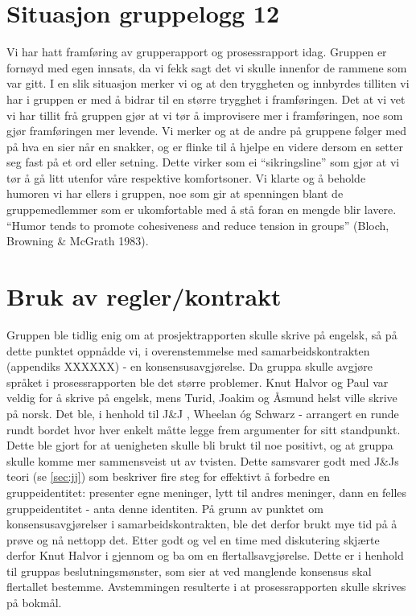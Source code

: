 \section{Situasjon gruppelogg 12}
Vi har hatt framføring av grupperapport og prosessrapport idag. Gruppen er fornøyd med egen innsats, da vi fekk sagt det vi skulle innenfor de rammene som var gitt. I en slik situasjon merker vi og at den tryggheten og innbyrdes tilliten vi har i gruppen er med å bidrar til en større trygghet i framføringen. Det at vi vet vi har tillit frå gruppen gjør at vi tør å improvisere mer i framføringen, noe som gjør framføringen mer levende. Vi merker og at de andre på gruppene følger med på hva en sier når en snakker, og er flinke til å hjelpe en videre dersom en setter seg fast på et ord eller setning. Dette virker som ei ``sikringsline'' som gjør at vi tør å gå litt utenfor våre respektive komfortsoner. Vi klarte og å beholde humoren vi har ellers i gruppen, noe som gir at spenningen blant de gruppemedlemmer som er ukomfortable med å stå foran en mengde blir lavere. ``Humor tends to promote cohesiveness and reduce tension in groups'' (Bloch, Browning \& McGrath 1983).\\


\section{Bruk av regler/kontrakt}

Gruppen ble tidlig enig om at prosjektrapporten skulle skrive på engelsk, så på
dette punktet oppnådde vi, i overenstemmelse med samarbeidskontrakten (appendiks
XXXXXX) - en konsensusavgjørelse. Da gruppa skulle avgjøre språket i
prosessrapporten ble det større problemer. Knut Halvor og Paul var veldig for å
skrive på engelsk, mens Turid, Joakim og Åsmund helst ville skrive på norsk. Det
ble, i henhold til J\&J \cite{jj}, Wheelan \cite{wheelan} óg Schwarz
\cite{schwarz} - arrangert en runde rundt bordet hvor hver enkelt måtte legge
frem argumenter for sitt standpunkt. Dette ble gjort for at uenigheten skulle
bli brukt til noe positivt, og at gruppa skulle komme mer sammensveist ut av
tvisten. Dette samsvarer godt med J\&Js teori (se \cref{sec:jj}) som beskriver
fire steg for effektivt å forbedre en gruppeidentitet: presenter egne meninger,
lytt til andres meninger, dann en felles gruppeidentitet - anta denne identiten.
På grunn av punktet om konsensusavgjørelser i samarbeidskontrakten, ble det
derfor brukt mye tid på å prøve og nå nettopp det. Etter godt og vel en time med
diskutering skjærte derfor Knut Halvor i gjennom og ba om en
flertallsavgjørelse. Dette er i henhold til gruppas beslutningsmønster, som sier
at ved manglende konsensus skal flertallet bestemme. Avstemmingen resulterte i
at prosessrapporten skulle skrives på bokmål. \\

